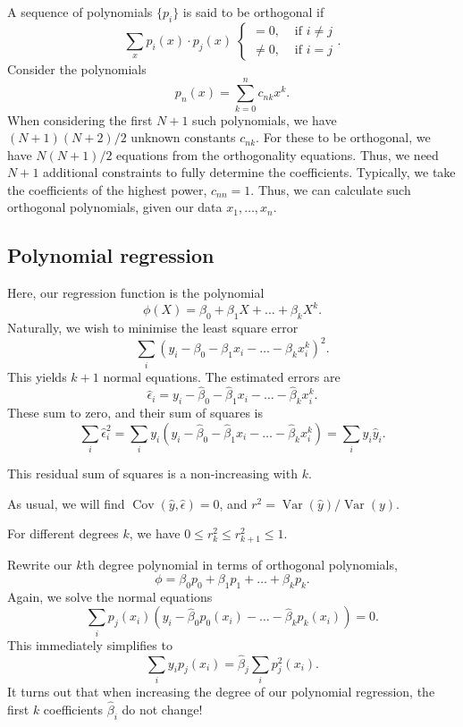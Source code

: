 \documentclass[11pt]{article}
\DeclareMathOperator{\var}{Var}
\DeclareMathOperator{\cov}{Cov}
\theoremstyle{definition}
\theoremstyle{remark}
\numberwithin{equation}{section}
\begin{document}
    A sequence of polynomials $\{p_i\}$ is said to be orthogonal if \[
        \sum_x p_i(x)\cdot p_j(x) \;\begin{cases}
            = 0, &\text{ if } i \neq j \\
            \neq 0, &\text{ if } i = j
        \end{cases}.
    \] Consider the polynomials \[
        p_n(x) = \sum_{k = 0}^n c_{nk}x^k.
    \] When considering the first $N + 1$ such polynomials, we have $(N + 1)(N + 2) /
    2$ unknown constants $c_{nk}$. For these to be orthogonal, we have $N(N + 1) / 2$
    equations from the orthogonality equations. Thus, we need $N + 1$ additional
    constraints to fully determine the coefficients. Typically, we take the
    coefficients of the highest power, $c_{nn} = 1$. Thus, we can calculate such
    orthogonal polynomials, given our data $x_1, \dots, x_n$.


    \subsection{Polynomial regression}

    Here, our regression function is the polynomial \[
        \phi(X) = \beta_0 + \beta_1 X + \dots + \beta_k X^k.
    \] Naturally, we wish to minimise the least square error \[
        \sum_{i} (y_i - \beta_0 - \beta_1 x_i - \dots - \beta_k x_i^k)^2.
    \] This yields $k + 1$ normal equations. The estimated errors are \[
        \hat{\epsilon}_i = y_i - \hat{\beta}_0 - \hat{\beta}_1x_i - \dots -
        \hat{\beta}_kx_i^k.
    \] These sum to zero, and their sum of squares is \[
        \sum_i \hat{\epsilon}_i^2 = \sum_i y_i(y_i - \hat{\beta}_0 -
        \hat{\beta}_1x_i - \dots - \hat{\beta}_kx_i^k) = \sum_i y_i \hat{y}_i.
    \]

    \begin{lemma}
        This residual sum of squares is a non-increasing with $k$.
    \end{lemma}

    As usual, we will find $\cov(\hat{y}, \hat{\epsilon}) = 0$, and $r^2 =
    \var(\hat{y}) / \var(y)$.

    \begin{lemma}
        For different degrees $k$, we have $0 \leq r_k^2 \leq r_{k + 1}^2 \leq 1$.
    \end{lemma}

    Rewrite our $k$th degree polynomial in terms of orthogonal polynomials, \[
        \phi = \beta_0p_0 + \beta_1p_1 + \dots + \beta_kp_k.
    \] Again, we solve the normal equations \[
        \sum_i p_j(x_i)(y_i - \hat{\beta}_0p_0(x_i) - \dots - \hat{\beta}_kp_k(x_i)) = 0.
    \] This immediately simplifies to \[
        \sum_i y_ip_j(x_i) = \hat{\beta}_j\sum_i p_j^2(x_i).
    \] It turns out that when increasing the degree of our polynomial regression, the
    first $k$ coefficients $\hat{\beta}_i$ do not change!
\end{document}
